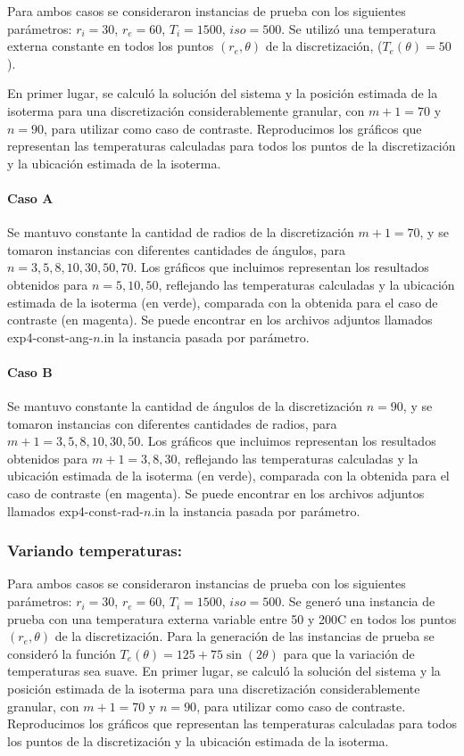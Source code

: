         Para ambos casos se consideraron instancias de prueba con los siguientes parámetros: $r_i = 30$, $r_e = 60$, $T_i = 1500$, $iso = 500$. Se utilizó una temperatura externa constante en todos los puntos $(r_e, \theta)$ de la discretización, ($T_e(\theta) = 50$). 

        En primer lugar, se calculó la solución del sistema y la posición estimada de la isoterma para una discretización considerablemente granular, con $m + 1 = 70$ y $n = 90$, para utilizar como caso de contraste. Reproducimos los gráficos que representan las temperaturas calculadas para todos los puntos de la discretización y la ubicación estimada de la isoterma. 

        \paragraph{Caso A} Se mantuvo constante la cantidad de radios de la discretización $m + 1 = 70$, y se tomaron instancias con diferentes cantidades de ángulos, para $n = 3, 5, 8, 10, 30, 50, 70$. Los gráficos que incluimos representan los resultados obtenidos para $n = 5, 10, 50$, reflejando las temperaturas calculadas y la ubicación estimada de la isoterma (en verde), comparada con la obtenida para el caso de contraste (en magenta). Se puede encontrar en los archivos adjuntos llamados exp4-const-ang-$n$.in  la instancia pasada por parámetro.

        \paragraph{Caso B} Se mantuvo constante la cantidad de ángulos de la discretización $n = 90$, y se tomaron instancias con diferentes cantidades de radios, para $m + 1 = 3, 5, 8, 10, 30, 50$. Los gráficos que incluimos representan los resultados obtenidos para $m + 1 = 3, 8, 30$, reflejando las temperaturas calculadas y la ubicación estimada de la isoterma (en verde), comparada con la obtenida para el caso de contraste (en magenta). Se puede encontrar en los archivos adjuntos llamados exp4-const-rad-$n$.in  la instancia pasada por parámetro.

      \subsubsection*{Variando temperaturas:}
        Para ambos casos se consideraron instancias de prueba con los siguientes parámetros: $r_i = 30$, $r_e = 60$, $T_i = 1500$, $iso = 500$. Se generó una instancia de prueba con una temperatura externa variable entre 50 y 200{\degree}C en todos los puntos $(r_e, \theta)$ de la discretización. 
        Para la generación de las instancias de prueba se consideró la función $T_e(\theta) = 125 + 75 \sin(2\theta)$ para que la variación de temperaturas sea suave.
        En primer lugar, se calculó la solución del sistema y la posición estimada de la isoterma para una discretización considerablemente granular, con $m + 1 = 70$ y $n = 90$, para utilizar como caso de contraste. Reproducimos los gráficos que representan las temperaturas calculadas para todos los puntos de la discretización y la ubicación estimada de la isoterma.

